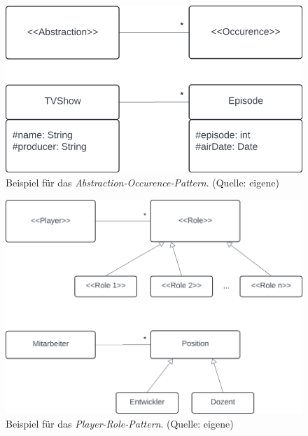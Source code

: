\begin{figure}
    \centering
    \includegraphics[scale=0.3]{part two/Objektorientierte Analyse/img/abstractionoccurence}
    \caption{Beispiel für das \textit{Abstraction-Occurence-Pattern}. (Quelle: eigene)}
    \label{fig:abstractionoccurence_cc}
\end{figure}
\begin{figure}
    \centering
    \includegraphics[scale=0.3]{part two/Objektorientierte Analyse/img/playerrole}
    \caption{Beispiel für das \textit{Player-Role-Pattern}. (Quelle: eigene)}
    \label{fig:playerrole_cc}
\end{figure}
